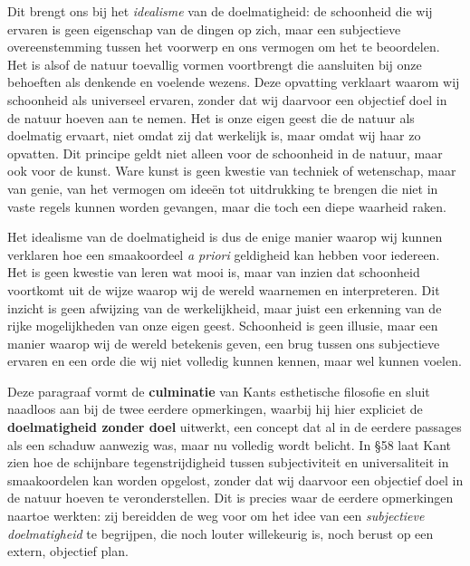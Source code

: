 \begin{mdframed}[leftmargin=0pt,rightmargin=0pt,backgroundcolor=blue!6,linecolor=white,innertopmargin=6pt,innerbottommargin=6pt]
Dit brengt ons bij het \textit{idealisme} van de doelmatigheid: de schoonheid die wij ervaren is geen eigenschap van de dingen op zich, maar een subjectieve overeenstemming tussen het voorwerp en ons vermogen om het te beoordelen. Het is alsof de natuur toevallig vormen voortbrengt die aansluiten bij onze behoeften als denkende en voelende wezens. Deze opvatting verklaart waarom wij schoonheid als universeel ervaren, zonder dat wij daarvoor een objectief doel in de natuur hoeven aan te nemen. Het is onze eigen geest die de natuur als doelmatig ervaart, niet omdat zij dat werkelijk is, maar omdat wij haar zo opvatten. Dit principe geldt niet alleen voor de schoonheid in de natuur, maar ook voor de kunst. Ware kunst is geen kwestie van techniek of wetenschap, maar van genie, van het vermogen om ideeën tot uitdrukking te brengen die niet in vaste regels kunnen worden gevangen, maar die toch een diepe waarheid raken.

Het idealisme van de doelmatigheid is dus de enige manier waarop wij kunnen verklaren hoe een smaakoordeel \textit{a priori} geldigheid kan hebben voor iedereen. Het is geen kwestie van leren wat mooi is, maar van inzien dat schoonheid voortkomt uit de wijze waarop wij de wereld waarnemen en interpreteren. Dit inzicht is geen afwijzing van de werkelijkheid, maar juist een erkenning van de rijke mogelijkheden van onze eigen geest. Schoonheid is geen illusie, maar een manier waarop wij de wereld betekenis geven, een brug tussen ons subjectieve ervaren en een orde die wij niet volledig kunnen kennen, maar wel kunnen voelen.

\bigskip

Deze paragraaf vormt de \textbf{culminatie} van Kants esthetische filosofie en sluit naadloos aan bij de twee eerdere opmerkingen, waarbij hij hier expliciet de \textbf{doelmatigheid zonder doel} uitwerkt, een concept dat al in de eerdere passages als een schaduw aanwezig was, maar nu volledig wordt belicht. In §58 laat Kant zien hoe de schijnbare tegenstrijdigheid tussen subjectiviteit en universaliteit in smaakoordelen kan worden opgelost, zonder dat wij daarvoor een objectief doel in de natuur hoeven te veronderstellen. Dit is precies waar de eerdere opmerkingen naartoe werkten: zij bereidden de weg voor om het idee van een \textit{subjectieve doelmatigheid} te begrijpen, die noch louter willekeurig is, noch berust op een extern, objectief plan.


\end{mdframed}

